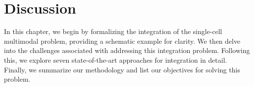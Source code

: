 \section{Discussion}
\label{bgInte:Discussion}
In this chapter, we begin by formalizing the integration of the single-cell multimodal problem, providing a schematic example for clarity. We then delve into the challenges associated with addressing this integration problem. Following this, we explore seven state-of-the-art approaches for integration in detail. Finally, we summarize our methodology and list our objectives for solving this problem.
